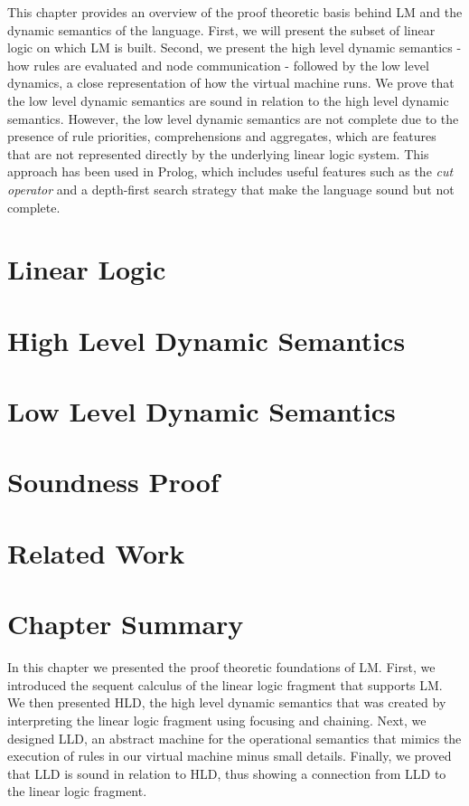 This chapter provides an overview of the proof theoretic basis behind LM and the
dynamic semantics of the language. First, we will present the subset of linear
logic on which LM is built. Second, we present the high level dynamic semantics
- how rules are evaluated and node communication - followed by the low level
dynamics, a close representation of how the virtual machine runs. We prove that
the low level dynamic semantics are sound in relation to the high level dynamic
semantics. However, the low level dynamic semantics are not complete due to the
presence of rule priorities, comprehensions and aggregates, which are features
that are not represented directly by the underlying linear logic system.  This
approach has been used in Prolog, which includes useful features such as the
\emph{cut operator} and a depth-first search strategy that make the language
sound but not complete.

\section{Linear Logic}


\section{High Level Dynamic Semantics}



\section{Low Level Dynamic Semantics}

\section{Soundness Proof}

\section{Related Work}

\section{Chapter Summary}

In this chapter we presented the proof theoretic foundations of LM.  First, we
introduced the sequent calculus of the linear logic fragment that supports LM. We then
presented HLD, the high level dynamic semantics that was created by interpreting
the linear logic fragment using focusing and chaining. Next, we designed LLD,
an abstract machine for the operational semantics that mimics the execution of
rules in our virtual machine minus small details.  Finally, we proved that LLD is sound
in relation to HLD, thus showing a connection from LLD to the linear logic
fragment.

